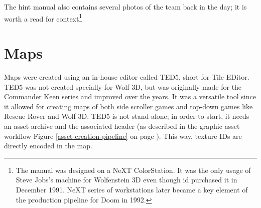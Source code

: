 \documentclass[book.tex]{subfiles}
\begin{document}
     \begin{figure}[H]
\centering
   \end{figure}


\par 
The hint manual also contains several photos of the team back in the day; it is worth a read for context\footnote{The manual was designed on a NeXT ColorStation. It was the only usage of Steve Jobs's machine for Wolfenstein 3D even though id purchased it in December 1991. NeXT series of workstations later became a key element of the production pipeline for Doom in 1992.}













\section{Maps}
Maps were created using an in-house editor called TED5, short for Tile EDitor. TED5 was not created specially for Wolf 3D, but was originally made for the Commander Keen series and improved over the years. It was a versatile tool since it allowed for creating maps of both side scroller games and top-down games like Rescue Rover and Wolf 3D. TED5 is not stand-alone; in order to start, it needs an asset archive and the  associated header (as described in the graphic asset workflow Figure \ref{asset-creation-pipeline} on page \pageref{asset-creation-pipeline}). This way, texture IDs are directly encoded in the map.\\

 \begin{figure}[H]
\centering
 \end{figure}

  \begin{figure}[H]
\centering

 \end{figure}


 \begin{figure}[H]
\centering
 \end{figure}


\begin{figure}[H]
\centering
 \end{figure}
\end{document}
